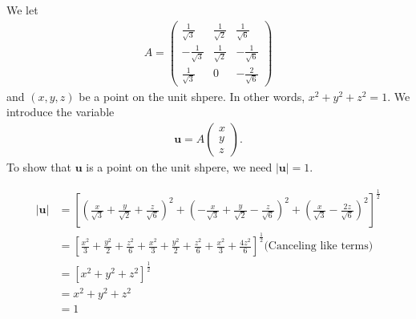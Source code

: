 \documentclass[a4paper,10pt,english]{article}
\begin{document}
\subsection{} \label{2a}
We let 
\begin{align}
    A = 
    \begin{pmatrix}
        \frac{1}{\sqrt 3} & \frac{1}{\sqrt 2} & \frac{1}{\sqrt 6} \\
        - \frac{1}{\sqrt 3} & \frac{1}{\sqrt 2} & - \frac{1}{\sqrt 6} \\
        \frac{1}{\sqrt 3} & 0 & - \frac{2}{\sqrt 6}
    \end{pmatrix}
\end{align}
and $(x, y, z)$ be a point on the unit shpere. In other words, $x^2 + y^2 + z^2 = 1$. We introduce the variable
\begin{align*}
    \bm{u} = A 
    \begin{pmatrix}
        x\\ 
        y\\ 
        z
    \end{pmatrix}.
\end{align*}
To show that $\bm{u}$ is a point on the unit shpere, we need $|\bm{u}|=1$.

\begin{align*}
    |\bm{u}| &= 
    \left[ \left( 
        \frac{x}{\sqrt 3} + \frac{y}{\sqrt 2} + \frac{z}{\sqrt6}
    \right)^2 
    + \left( 
        - \frac{x}{\sqrt 3} + \frac{y}{\sqrt 2} - \frac{z}{\sqrt6}
    \right)^2
    + \left( 
        \frac{x}{\sqrt 3} - \frac{2z}{\sqrt6}
    \right)^2 \right]^{\frac{1}{2}}\\
    &= \left[ \frac{x^2}{3} + \frac{y^2}{2} + \frac{z^2}{6}
    + \frac{x^2}{3} + \frac{y^2}{2} + \frac{z^2}{6}
    + \frac{x^2}{3} + \frac{4z^2}{6} \right]^{\frac{1}{2}} \text{(Canceling like terms)}\\
    &= \left[ x^2 + y^2 + z^2 \right]^{\frac{1}{2}} \\
    &= x^2 + y^2 + z^2 \\
    &= 1
\end{align*}

\subsection{} \label{2b}
\end{document}

